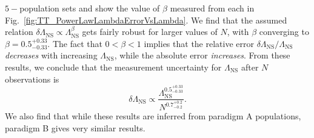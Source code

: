 \documentclass[aps,prd,amsmath,floats,floatfix, twocolumn,
superscriptaddress,nofootinbib,showpacs]{revtex4-1}
\newcommand{\lambdans}{\Lambda_\mathrm{NS}}
\begin{document}
\begin{appendix}
$5-$population sets and show the value of $\beta$ measured from each in 
Fig.~\ref{fig:TT_PowerLawLambdaErrorVsLambda}. We find that the assumed
relation $\delta\lambdans\propto\lambdans^\beta$ gets fairly robust for 
larger values of $N$, with $\beta$ converging to $\beta=0.5^{+0.33}_{-0.33}$.
The fact that $0<\beta<1$ implies that the relative error
$\delta\lambdans/\lambdans$ {\it decreases} with increasing $\lambdans$, while
the absolute error {\it increases}.
% 
From these results, we conclude that the measurement uncertainty for
$\lambdans$ after $N$ observations is
\begin{equation}
 \delta\lambdans\propto \dfrac{\lambdans^{0.5^{+0.33}_{-0.33}}}{N^{0.7_{-0.2}^{+0.2}}}.
\end{equation}
We also find that while these results are inferred from paradigm A populations,
paradigm B gives very similar results.





\end{appendix}
\end{document}
